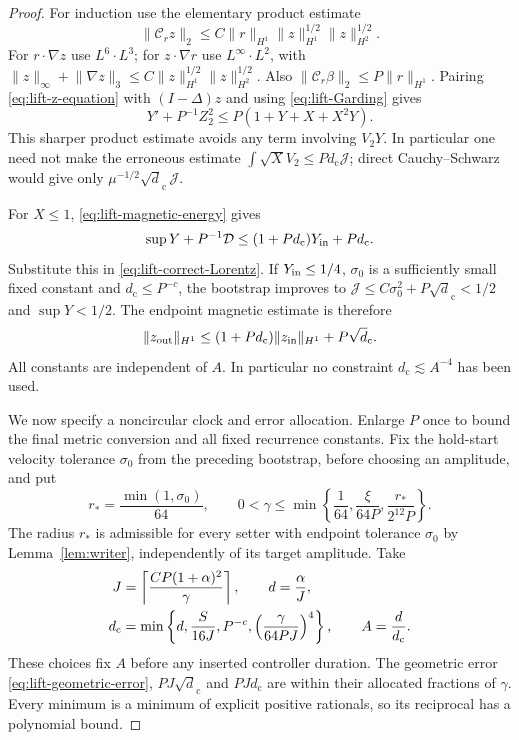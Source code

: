 \documentclass[11pt,a4paper]{amsart}
\theoremstyle{definition}
\theoremstyle{remark}
\numberwithin{equation}{section}
\newcommand{\Ccal}{\mathcal C}
\newcommand{\norm}[1]{\lVert #1\rVert}
\begin{document}
\begin{proof}
For induction use the elementary product estimate
\begin{equation}\label{eq:lift-induction-product}
 \norm{\Ccal_rz}_2
 \le C\norm r_{H^1}\norm z_{H^1}^{1/2}\norm z_{H^2}^{1/2}.
\end{equation}
For $r\cdot\nabla z$ use $L^6\cdot L^3$; for
$z\cdot\nabla r$ use $L^\infty\cdot L^2$, with
$\norm z_\infty+\norm{\nabla z}_3
 \le C\norm z_{H^1}^{1/2}\norm z_{H^2}^{1/2}$.
Also $\norm{\Ccal_r\beta}_2\le P\norm r_{H^1}$.
Pairing \eqref{eq:lift-z-equation} with $(I-\Delta)z$ and using
\eqref{eq:lift-Garding} gives
\begin{equation}\label{eq:lift-magnetic-energy}
 Y'+P^{-1}Z_2^2\le P(1+Y+X+X^2Y).
\end{equation}
This sharper product estimate avoids any term involving $V_2Y$.  In
particular one need not make the erroneous estimate
$\int\sqrt X V_2\le Pd_{\mathrm c}\mathcal J$; direct Cauchy--Schwarz would give
only $\mu^{-1/2}\sqrt d_{\mathrm c}\,\mathcal J$.

For $X\le1$, \eqref{eq:lift-magnetic-energy} gives
\[
 \sup Y+P^{-1}\mathcal D\le(1+Pd_{\mathrm c})Y_{\rm in}+Pd_{\mathrm c}.
\]
Substitute this in \eqref{eq:lift-correct-Lorentz}.  If $Y_{\rm in}\le1/4$,
$\sigma_0$ is a sufficiently small fixed constant and $d_{\mathrm c}\le P^{-c}$, the
bootstrap improves to
$\mathcal J\le C\sigma_0^2+P\sqrt d_{\mathrm c}<1/2$ and $\sup Y<1/2$.
The endpoint magnetic estimate is therefore
\begin{equation}\label{eq:lift-hold-recurrence}
 \norm{z_{\rm out}}_{H^1}
    \le(1+Pd_{\mathrm c})\norm{z_{\rm in}}_{H^1}+P\sqrt d_{\mathrm c}.
\end{equation}
All constants are independent of $A$.  In particular no constraint
$d_{\mathrm c}\lesssim A^{-4}$ has been used.

We now specify a noncircular clock and error allocation. Enlarge $P$ once
to bound the final metric conversion and all fixed recurrence constants.
Fix the hold-start velocity tolerance $\sigma_0$ from the preceding
bootstrap, before choosing an amplitude, and put
\[
 r_*=\frac{\min(1,\sigma_0)}{64},\qquad
 0<\gamma\le\min\left\{\frac1{64},\frac{\xi}{64P},
                                  \frac{r_*}{2^{12}P}\right\}.
\]
The radius $r_*$ is admissible for every setter with endpoint tolerance
$\sigma_0$ by Lemma~\ref{lem:writer}, independently of its target amplitude.
Take
\begin{align}\label{eq:lift-clock-choice}
 J&=\left\lceil \frac{CP(1+\alpha)^2}{\gamma}\right\rceil,
 \qquad d=\frac{\alpha}{J},\notag\\
 d_{\mathrm c}&=\min\left\{d,\frac{S}{16J},P^{-c},
                 \left(\frac{\gamma}{64PJ}\right)^4\right\},
 \qquad A=\frac{d}{d_{\mathrm c}}.
\end{align}
These choices fix $A$ before any inserted controller duration.  The
geometric error \eqref{eq:lift-geometric-error},
$PJ\sqrt d_{\mathrm c}$ and $PJd_{\mathrm c}$ are within their allocated fractions of $\gamma$.
Every minimum is a minimum of explicit positive rationals, so its reciprocal
has a polynomial bound.


\end{proof}
\end{document}
